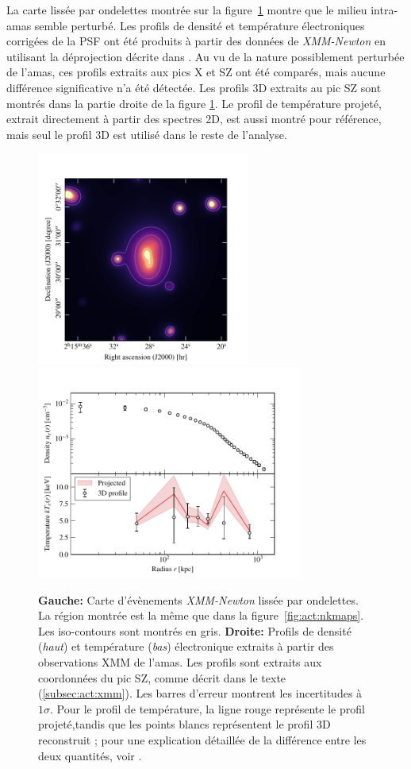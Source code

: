 La carte lissée par ondelettes montrée sur la figure~\ref{fig:act:xmm} montre que le milieu intra-amas semble perturbé.
Les profils de densité et température électroniques corrigées de la PSF ont été produits à partir des données de \textit{XMM-Newton} en utilisant la déprojection décrite dans \cite{pratt_gas_2010}.
Au vu de la nature possiblement perturbée de l'amas, ces profils extraits aux pics X et SZ ont été comparés, mais aucune différence significative n'a été détectée.
Les profils 3D extraits au pic SZ sont montrés dans la partie droite de la figure \ref{fig:act:xmm}.
Le profil de température projeté, extrait directement à partir des spectres 2D, est aussi montré pour référence, mais seul le profil 3D est utilisé dans le reste de l'analyse.

\begin{figure}[t]
    \centering
    \includegraphics[height=7cm, trim={0cm, 0cm, 1cm, 1cm}, clip]{Figures/Chap_actj0215/xmm_map.pdf}
    \hfill
    \includegraphics[height=7cm, trim={0cm, 0cm, 1cm, 1cm}, clip]{Figures/Chap_actj0215/xmm_profs.pdf}
    \caption[XMM]{%
        \textbf{Gauche:} Carte d'évènements \textit{XMM-Newton} lissée par ondelettes.
        La région montrée est la même que dans la figure~\ref{fig:act:nkmaps}.
        Les iso-contours sont montrés en gris.
        \textbf{Droite:} Profils de densité (\textit{haut}) et température (\textit{bas}) électronique extraits à partir des observations XMM de l'amas.
        Les profils sont extraits aux coordonnées du pic SZ, comme décrit dans le texte (\ref{subsec:act:xmm}).
        Les barres d'erreur montrent les incertitudes à $1\sigma$.
        Pour le profil de température, la ligne rouge représente le profil projeté,tandis que les points blancs représentent le profil 3D reconstruit ; pour une explication détaillée de la différence entre les deux quantités, voir \cite{pratt_gas_2010}.
    }
    \label{fig:act:xmm}
\end{figure}

